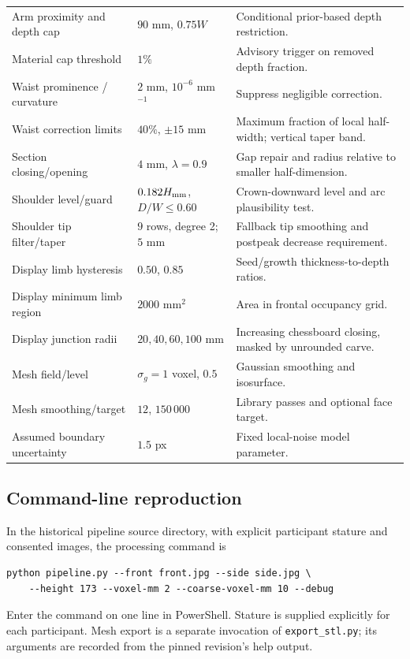 \documentclass[11pt,a4paper]{article}
\numberwithin{equation}{section}
\begin{document}
\begin{longtable}{L{4.7cm}L{3.3cm}L{6.7cm}}
Arm proximity and depth cap & $90$ mm, $0.75W$ & Conditional prior-based depth restriction. \\
Material cap threshold & $1\%$ & Advisory trigger on removed depth fraction. \\
Waist prominence / curvature & $2$ mm, $10^{-6}$ mm$^{-1}$ & Suppress negligible correction. \\
Waist correction limits & $40\%$, $\pm15$ mm & Maximum fraction of local half-width; vertical taper band. \\
Section closing/opening & $4$ mm, $\lambda=0.9$ & Gap repair and radius relative to smaller half-dimension. \\
Shoulder level/guard & $0.182H_{\rm mm}$, $D/W\le0.60$ & Crown-downward level and arc plausibility test. \\
Shoulder tip filter/taper & $9$ rows, degree 2; $5$ mm & Fallback tip smoothing and postpeak decrease requirement. \\
Display limb hysteresis & $0.50$, $0.85$ & Seed/growth thickness-to-depth ratios. \\
Display minimum limb region & $2000$ mm$^2$ & Area in frontal occupancy grid. \\
Display junction radii & $20,40,60,100$ mm & Increasing chessboard closing, masked by unrounded carve. \\
Mesh field/level & $\sigma_g=1$ voxel, $0.5$ & Gaussian smoothing and isosurface. \\
Mesh smoothing/target & $12$, $150\,000$ & Library passes and optional face target. \\
Assumed boundary uncertainty & $1.5$ px & Fixed local-noise model parameter. \\
\end{longtable}

\subsection{Command-line reproduction}
In the historical pipeline source directory, with explicit participant stature and consented images, the processing command is
\begin{verbatim}
python pipeline.py --front front.jpg --side side.jpg \
    --height 173 --voxel-mm 2 --coarse-voxel-mm 10 --debug
\end{verbatim}
Enter the command on one line in PowerShell. Stature is supplied explicitly for each participant. Mesh export is a separate invocation of \nolinkurl{export_stl.py}; its arguments are recorded from the pinned revision's help output.
\end{document}

